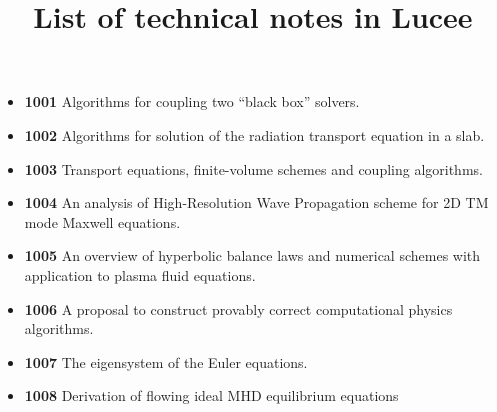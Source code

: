 \documentclass[11pt]{article}
\title{List of technical notes in Lucee}
\author{}
\date{}
\begin{document}
\maketitle

\begin{itemize}
  \item {\bf 1001} Algorithms for coupling two ``black box'' solvers.
  \item {\bf 1002} Algorithms for solution of the radiation transport
    equation in a slab.
  \item {\bf 1003} Transport equations, finite-volume schemes and
    coupling algorithms.
  \item {\bf 1004} An analysis of High-Resolution Wave Propagation
    scheme for 2D TM mode Maxwell equations.
  \item {\bf 1005} An overview of hyperbolic balance laws and
    numerical schemes with application to plasma fluid equations.
  \item {\bf 1006} A proposal to construct provably correct
    computational physics algorithms.
  \item {\bf 1007} The eigensystem of the Euler equations.
  \item {\bf 1008} Derivation of flowing ideal MHD equilibrium equations
\end{itemize}
\end{document}
